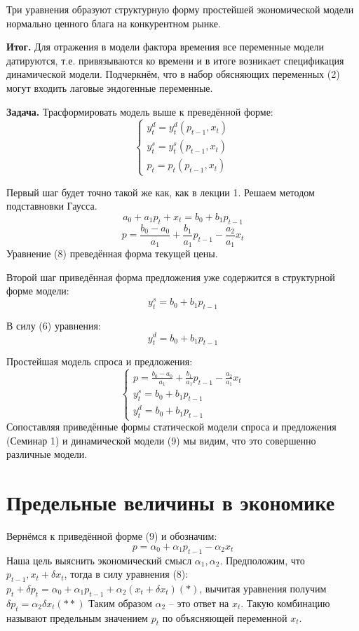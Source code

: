 \documentclass[12pt,a4paper]{article}
\begin{document}
Три уравнения образуют структурную форму простейшей экономической модели нормально ценного блага на конкурентном рынке.

\textbf{Итог.} Для отражения в модели фактора времения все переменные модели датируются, т.е. привязываются ко времени и в итоге возникает спецификация динамической модели. Подчеркнём, что в набор обясняющих переменных (2) могут входить лаговые эндогенные переменные.

\textbf{Задача.} Трасформировать модель выше к преведённой форме:
\begin{equation}
\begin{cases}
y_t^d = y_t^d(p_{t-1}, x_t) \\
y_t^s = y_t^s(p_{t-1}, x_t) \\
p_t = p_t(p_{t-1}, x_t)
\end{cases}
\end{equation}

Первый шаг будет точно такой же как, как в лекции 1. Решаем методом подставновки Гаусса.
$$a_0 + a_1 p_t + x_t = b_0 + b_1 p_{t - 1}$$
\begin{equation}
p = \frac{b_0 - a_0}{a_1} + \frac{b_1}{a_1}p_{t-1} - \frac{a_2}{a_1} x_t
\end{equation}
Уравнение (8) преведённая форма текущей цены.

Второй шаг приведённая форма предложения уже содержится в структурной форме модели:
$$y_t^s = b_0 + b_1 p_{t - 1}$$

В силу (6) уравнения:
$$y_t^d = b_0 + b_1 p_{t - 1}$$

Простейшая модель спроса и предложения:
\begin{equation}
\begin{cases}
p = \frac{b_0 - a_0}{a_1} + \frac{b_1}{a_1}p_{t-1} - \frac{a_2}{a_1} x_t \\
y_t^s = b_0 + b_1 p_{t - 1} \\
y_t^d = b_0 + b_1 p_{t - 1}
\end{cases}
\end{equation}
Сопоставляя приведённые формы статической модели спроса и предложения (Семинар 1) и динамической модели (9) мы видим, что это совершенно различные модели.

\section*{Предельные величины в экономике}
Вернёмся к приведённой форме (9) и обозначим:
$$p = \alpha_0 + \alpha_1 p_{t-1} - \alpha_2 x_t$$
Наша цель выяснить экономический смысл $\alpha_1, \alpha_2$. Предположим, что $p_{t - 1}, x_t + \delta x_t$, тогда в силу уравнения (8): $p_t + \delta p_t = \alpha_0 + \alpha_1 p_{t-1} + \alpha_2(x_t + \delta x_t) (*)$, вычитая уравнения получим $\delta p_t = \alpha_2 \delta x_t (**)$
Таким образом $\alpha_2$ -- это ответ на $x_t$. Такую комбинацию называют предельным значением $p_t$ по объясняющей переменной $x_t$. 
\end{document}
